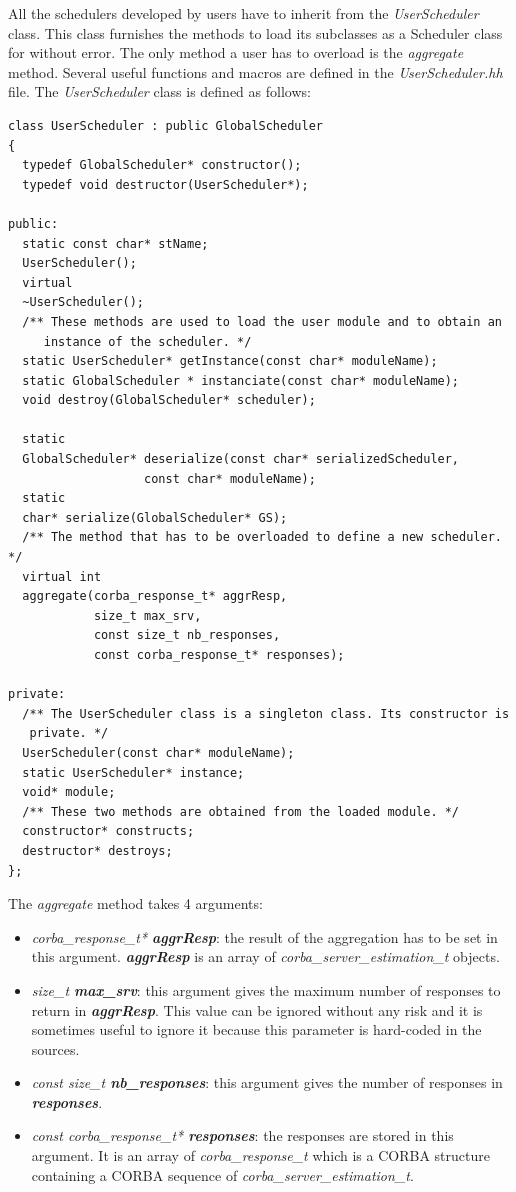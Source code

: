 All the schedulers developed by users have to inherit from the
\textit{UserScheduler} class. This class furnishes the methods to load
its subclasses as a Scheduler class for \diet without error. The only method
a user has to overload is the \textit{aggregate} method. Several useful
functions and macros are defined in the \textit{UserScheduler.hh} file.
The \textit{UserScheduler} class is defined as follows:
\begin{verbatim}
class UserScheduler : public GlobalScheduler
{
  typedef GlobalScheduler* constructor();
  typedef void destructor(UserScheduler*);

public:
  static const char* stName;
  UserScheduler();
  virtual
  ~UserScheduler();
  /** These methods are used to load the user module and to obtain an
     instance of the scheduler. */
  static UserScheduler* getInstance(const char* moduleName);
  static GlobalScheduler * instanciate(const char* moduleName);
  void destroy(GlobalScheduler* scheduler);

  static
  GlobalScheduler* deserialize(const char* serializedScheduler,
			       const char* moduleName);
  static
  char* serialize(GlobalScheduler* GS);
  /** The method that has to be overloaded to define a new scheduler. */
  virtual int
  aggregate(corba_response_t* aggrResp,
            size_t max_srv,
            const size_t nb_responses,
            const corba_response_t* responses);

private:
  /** The UserScheduler class is a singleton class. Its constructor is
   private. */
  UserScheduler(const char* moduleName);
  static UserScheduler* instance;
  void* module;
  /** These two methods are obtained from the loaded module. */
  constructor* constructs;
  destructor* destroys;
};
\end{verbatim}

\noindent The \textit{aggregate} method takes 4 arguments:
\begin{itemize}
  \item \textit{corba\_response\_t* \bf aggrResp}: the result of the aggregation
    has to be set in this argument. \textit{\bf aggrResp} is an array of
    \textit{corba\_server\_estimation\_t} objects. 
  \item \textit{size\_t \bf max\_srv}: this argument gives the maximum number
    of responses to return in \textit{\bf aggrResp}. This value can be ignored
    without any risk and it is sometimes useful to ignore it because this
    parameter is hard-coded in the \diet sources.
  \item \textit{const size\_t \bf nb\_responses}: this argument gives the number
    of responses in \textit{\bf responses}.
  \item \textit{const corba\_response\_t* \bf responses}: the responses are
    stored in this argument. It is an array of \textit{corba\_response\_t}
    which is a CORBA structure containing a CORBA sequence of
    \textit{corba\_server\_estimation\_t}.
\end{itemize}

